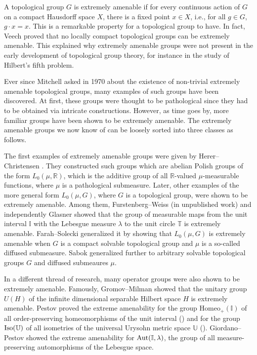 \documentclass{amsart}
\theoremstyle{definition}
\theoremstyle{remark}
\begin{document}
A topological group $G$ is extremely amenable if for every continuous action of $G$ on a compact Hausdorff space $X$, there is a fixed point $x\in X$, i.e., for all $g\in G$, $g\cdot x=x$. This is a remarkable property for a topological group to have. In fact, Veech \cite{Veech} proved that no locally compact topological groups can be extremely amenable. This explained why extremely amenable groups were not present in the early development of topological group theory, for instance in the study of Hilbert's fifth problem. 

Ever since Mitchell \cite{Mitchell} asked in 1970 about the existence of non-trivial extremely amenable topological groups, many examples of such groups have been discovered. At first, these groups were thought to be pathological since they had to be obtained via intricate constructions. However, as time goes by, more familiar groups have been shown to be extremely amenable. The extremely amenable groups we now know of can be loosely sorted into three classes as follows.

The first examples of extremely amenable groups were given by Herer--Christensen \cite{HC}. 
They constructed such groups which are abelian Polish groups of the form $L_0(\mu, \mathbb{R})$, which is the additive group of all $\mathbb{R}$-valued $\mu$-measurable functions, where $\mu$ is a pathological submeasure. Later, other examples of the more general form $L_0(\mu, G)$, where $G$ is a topological group, were shown to be extremely amenable. Among them, Furstenberg--Weiss (in unpublished work) and independently Glasner \cite{Glasner} showed that the group of measurable maps from the unit interval $\mathbb{I}$ with the Lebesgue measure $\lambda$ to the unit circle $\mathbb{T}$ is extremely amenable.  Farah--Solecki \cite{FS2008} generalized it by showing that $L_0(\mu, G)$ is extremely amenable when $G$ is a compact solvable topological group and $\mu$ is a so-called diffused submeasure. Sabok \cite{Marcin} generalized further to arbitrary solvable topological groups $G$ and diffused submeaures $\mu$. 

In a different thread of research, many operator groups were also shown to be extremely amenable. Famously, Gromov--Milman \cite{GM} showed that the unitary group $U(H)$ of the infinite dimensional separable Hilbert space $H$ is extremely amenable. Pestov proved the extreme amenability for the group $\mbox{Homeo}_+(\mathbb{I})$ of all order-preserving homeomorphisms of the unit interval (\cite{Pestov98}) and for the group $\mbox{\rm Iso}(\mathbb{U})$ of all isometries of the universal Urysohn metric space $\mathbb{U}$ (\cite{Pestov02}).  Giordano--Pestov \cite{GP} showed the extreme amenability for $\mbox{\rm Aut}(\mathbb{I},\lambda)$, the group of all measure-preserving automorphisms of the Lebesgue space.
\end{document}
